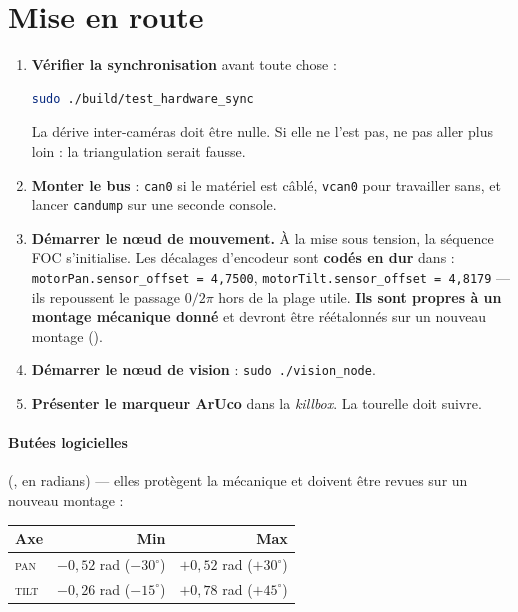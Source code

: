 \documentclass[11pt,a4paper]{article}
\begin{document}
\section{Mise en route}

\begin{enumerate}
  \item \textbf{Vérifier la synchronisation} avant toute chose :
        \begin{lstlisting}[language=bash]
sudo ./build/test_hardware_sync
        \end{lstlisting}
        La dérive inter-caméras doit être nulle. Si elle ne l'est pas, ne pas aller plus
        loin : la triangulation serait fausse.

  \item \textbf{Monter le bus} : \texttt{can0} si le matériel est câblé, \texttt{vcan0} pour
        travailler sans, et lancer \texttt{candump} sur une seconde console.

  \item \textbf{Démarrer le n\oe ud de mouvement.} À la mise sous tension, la séquence FOC
        s'initialise. Les décalages d'encodeur sont \textbf{codés en dur} dans
         :
        \texttt{motorPan.sensor\_offset = 4{,}7500}, \texttt{motorTilt.sensor\_offset =
        4{,}8179} — ils repoussent le passage $0/2\pi$ hors de la plage utile.
        \textbf{Ils sont propres à un montage mécanique donné} et devront être réétalonnés
        sur un nouveau montage ().

  \item \textbf{Démarrer le n\oe ud de vision} : \texttt{sudo ./vision\_node}.

  \item \textbf{Présenter le marqueur ArUco} dans la \emph{killbox}. La tourelle doit
        suivre.
\end{enumerate}

\paragraph{Butées logicielles} (, en radians) — elles protègent la
mécanique et doivent être revues sur un nouveau montage :
\begin{center}
\begin{tabular}{@{}lrr@{}}
\toprule
\textbf{Axe} & \textbf{Min} & \textbf{Max} \\
\midrule
\textsc{pan}  & $-0{,}52$ rad ($-30^\circ$) & $+0{,}52$ rad ($+30^\circ$) \\
\textsc{tilt} & $-0{,}26$ rad ($-15^\circ$) & $+0{,}78$ rad ($+45^\circ$) \\
\bottomrule
\end{tabular}
\end{center}
\end{document}
